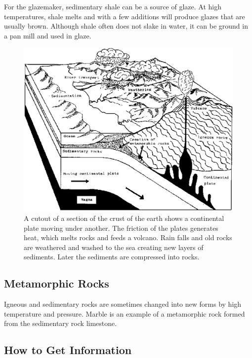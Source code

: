 For the glazemaker, sedimentary shale can be a source of glaze. At high 
temperatures, shale melts and with a few additions will produce glazes that are 
usually brown. Although shale often does not slake in water, it can be ground 
in a pan mill and used in glaze.
\begin{figure}[htbp!]
  \centering
  \includegraphics[width=0.9\linewidth]{img/continentalplate.eps}
  \caption{A cutout of a section of the crust of the earth shows a continental 
  plate moving under another. The friction of the plates generates heat, which 
  melts rocks and feeds a volcano. Rain falls and old rocks are weathered and 
  washed to the sea creating new layers of sediments. Later the sediments are 
  compressed into rocks.}
  \label{fig:continentalplate}
\end{figure}
\subsection{Metamorphic Rocks}
Igneous and sedimentary rocks are sometimes changed into new forms by high 
temperature and pressure. Marble is an example of a metamorphic rock formed 
from the sedimentary rock limestone.
\subsection{How to Get Information}
